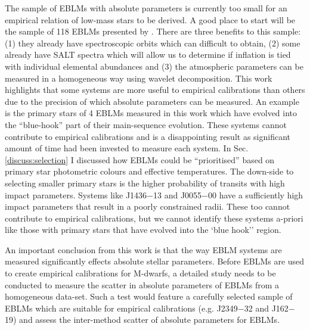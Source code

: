 The sample of EBLMs with absolute parameters is currently too small for an empirical relation of low-mass stars to be derived. A good place to start will be the sample of 118 EBLMs presented by \citet{Triaud2017}. There are three benefits to this sample: (1) they already have spectroscopic orbits which can difficult to obtain, (2) some already have SALT spectra which will allow us to determine if inflation is tied with individual elemental abundances and (3) the atmospheric parameters can be measured in a homogeneous way using wavelet decomposition. This work highlights that some systems are more useful to empirical calibrations than others due to the precision of which absolute parameters can be measured.  An example is the primary stars of 4 EBLMs measured in this work which have evolved into the ``blue-hook'' part of their main-sequence evolution. These systems cannot contribute to empirical calibrations and is a disappointing result as significant amount of time had been invested to measure each system. In Sec. \ref{discuss:selection} I discussed how EBLMs could be ``prioritised'' based on primary star photometric colours and effective temperatures. The down-side to selecting smaller primary stars is the higher probability of transits with high impact parameters. Systems like J1436$-$13 and J0055$-$00 have a sufficiently high impact parameters that result in a poorly constrained radii. These too cannot contribute to empirical calibrations, but we cannot identify these systems a-priori like those with primary stars that have evolved into the `blue hook'' region.


An important conclusion from this work is that the way EBLM systems are measured significantly effects absolute stellar parameters. Before EBLMs are used to create empirical calibrations for M-dwarfs, a detailed study needs to be conducted to measure the scatter in absolute parameters of EBLMs from a homogeneous data-set. Such a test would feature a carefully selected sample of EBLMs which are suitable for empirical calibrations (e.g. J2349$-$32 and J162$-$19) and assess the inter-method scatter of absolute parameters for EBLMs.

